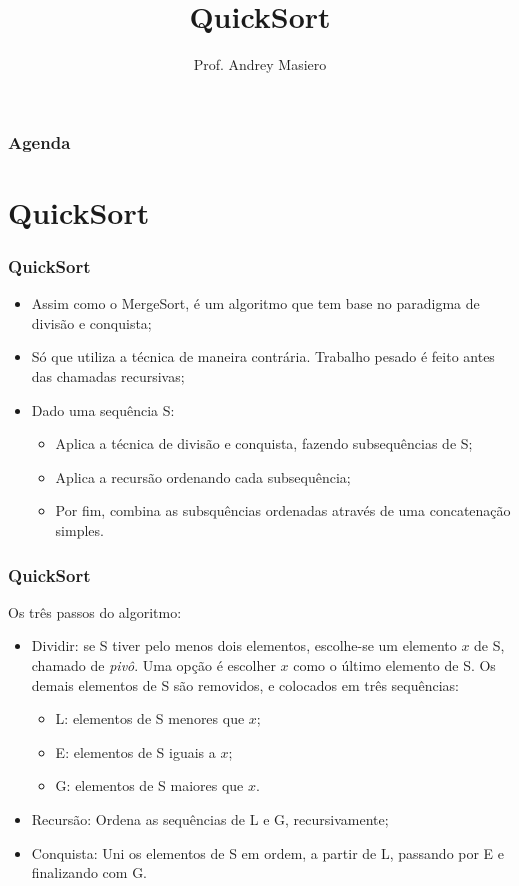 \documentclass{beamer}
\begin{document}
\title[QuickSort]{QuickSort}
\author{Prof. Andrey Masiero}

\begin{frame}
  \titlepage
\end{frame}

\begin{frame}
  \frametitle{Agenda}
  \tableofcontents
\end{frame}

\section{QuickSort}

\begin{frame}
	\frametitle{QuickSort}
    \begin{itemize}[<+->]
        \item Assim como o MergeSort, é um algoritmo que tem base no paradigma de divisão e conquista;
        \item Só que utiliza a técnica de maneira contrária. Trabalho pesado é feito antes das chamadas recursivas;
        \item Dado uma sequência S:
        \begin{itemize}
            \item Aplica a técnica de divisão e conquista, fazendo subsequências de S;
            \item Aplica a recursão ordenando cada subsequência;
            \item Por fim, combina as subsquências ordenadas através de uma concatenação simples.
        \end{itemize}
    \end{itemize}
\end{frame}


\begin{frame}
	\frametitle{QuickSort}
    Os três passos do algoritmo:
    \begin{itemize}[<+->]
        \item Dividir: se S tiver pelo menos dois elementos, escolhe-se um elemento $x$ de S, chamado de \emph{pivô}. Uma opção é escolher $x$ como o último elemento de S. Os demais elementos de S são removidos, e colocados em três sequências:
        \begin{itemize}
            \item L: elementos de S menores que $x$;
            \item E: elementos de S iguais a $x$;
            \item G: elementos de S maiores que $x$.
        \end{itemize}
        \item Recursão: Ordena as sequências de L e G, recursivamente;
        \item Conquista: Uni os elementos de S em ordem, a partir de L, passando por E e finalizando com G.
    \end{itemize}
\end{frame}
\end{document}
